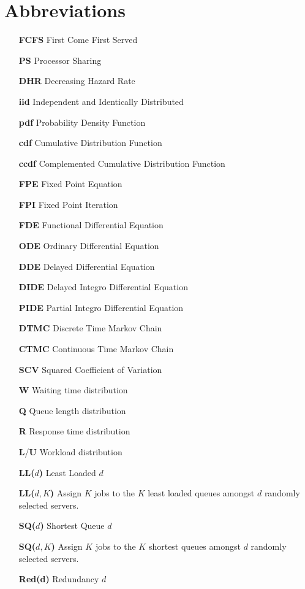 \documentclass[12pt]{report}
\begin{document}
\chapter*{Abbreviations}
\begin{itemize}
\item[\textbf{FCFS}] First Come First Served
\item[\textbf{PS}] Processor Sharing
\item[\textbf{DHR}] Decreasing Hazard Rate
\item[\textbf{iid}] Independent and Identically Distributed
\item[\textbf{pdf}] Probability Density Function
\item[\textbf{cdf}] Cumulative Distribution Function
\item[\textbf{ccdf}] Complemented Cumulative Distribution Function
\item[\textbf{FPE}] Fixed Point Equation
\item[\textbf{FPI}] Fixed Point Iteration
\item[\textbf{FDE}] Functional Differential Equation
\item[\textbf{ODE}] Ordinary Differential Equation
\item[\textbf{DDE}] Delayed Differential Equation
\item[\textbf{DIDE}] Delayed Integro Differential Equation
\item[\textbf{PIDE}] Partial Integro Differential Equation
\item[\textbf{DTMC}] Discrete Time Markov Chain
\item[\textbf{CTMC}] Continuous Time Markov Chain
\item[\textbf{SCV}] Squared Coefficient of Variation
\item[\textbf{W}] Waiting time distribution
\item[\textbf{Q}] Queue length distribution
\item[\textbf{R}] Response time distribution
\item[\textbf{L}/\textbf{U}] Workload distribution
\item[\textbf{LL($d$)}] Least Loaded $d$
\item[\textbf{LL($d, K$)}] Assign $K$ jobs to the $K$ least loaded queues amongst $d$ randomly selected servers.
\item[\textbf{SQ($d$)}] Shortest Queue $d$
\item[\textbf{SQ($d, K$)}] Assign $K$ jobs to the $K$ shortest queues amongst $d$ randomly selected servers.
\item[\textbf{Red(d)}] Redundancy $d$
\end{itemize}
\end{document}
